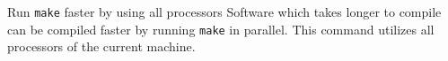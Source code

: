\begin{block}{Run \texttt{make} faster by using all processors}
  Software which takes longer to compile can be compiled faster by running \texttt{make} in parallel. This command utilizes all processors of the current machine.
\end{block}

